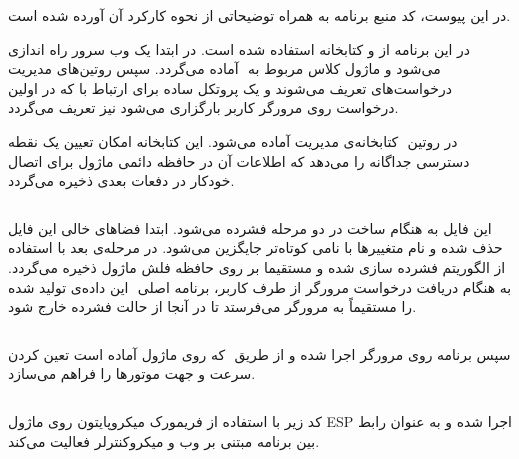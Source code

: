 
در این پیوست، کد منبع برنامه به همراه توضیحاتی از نحوه کارکرد آن آورده شده است.


در این برنامه از  و کتابخانه  استفاده شده است. در ابتدا یک وب سرور راه اندازی می‌شود و ماژول کلاس مربوط به ‌ آماده می‌گردد. سپس روتین‌های مدیریت درخواست‌های  تعریف می‌شوند و یک پروتکل ساده برای ارتباط با  که در اولین درخواست روی مرورگر کاربر بارگزاری می‌شود نیز تعریف می‌گردد.

در روتین ‌ کتابخانه‌ی مدیریت  آماده می‌شود. این کتابخانه امکان تعیین یک نقطه دسترسی جداگانه را می‌دهد که اطلاعات آن در حافظه دائمی ماژول برای اتصال خودکار در دفعات بعدی ذخیره می‌گردد.

\inputminted{c}{code/main.c}


این فایل به هنگام ساخت  ‌در دو مرحله فشرده می‌شود. ابتدا فضاهای خالی این فایل حذف شده و نام متغییرها با نامی کوتاه‌تر جایگزین می‌شود. در مرحله‌ی بعد با استفاده از الگوریتم ‌فشرده سازی شده و مستقیما بر روی حافظه فلش ماژول ذخیره می‌گردد. به هنگام دریافت درخواست مرورگر از طرف کاربر، برنامه اصلی ‌ این داده‌ی تولید شده را مستقیماً به مرورگر می‌فرستد تا در آنجا از حالت فشرده خارج شود.

\inputminted{html}{code/public/index.html}

سپس برنامه روی مرورگر اجرا شده و از طریق ‌ که روی ماژول آماده است تعین کردن سرعت و جهت موتورها را فراهم می‌سازد.

\inputminted{js}{code/public/main.js}



کد زیر با استفاده از فریمورک میکروپایتون روی ماژول ESP‌ اجرا شده و به عنوان رابط بین برنامه مبتنی بر وب و میکروکنترلر فعالیت می‌کند.
\inputminted{python}{code/boot.py}

\inputminted{python}{code/server.py}



